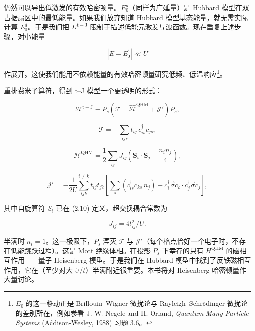 仍然可以导出低激发的有效哈密顿量。$E_{0}^{d}$（同样为广延量）是 Hubbard 模型在双占据扇区中的最低能量。如果我们放弃知道 Hubbard 模型基态能量，就无需实际计算 $E_{0}^{d}$。于是我们把 $H^{\mathrm{t-J}}$ 限制于描述低能元激发与波函数。现在重复上述步骤，对小能量

\begin{equation*}
\left| E - E _ {0} ^ {\prime} \right| \ll U
\tag{3.27}
\end{equation*}

作展开。这使我们能用不依赖能量的有效哈密顿量研究低频、低温响应\footnote{$E_{0}$ 的这一移动正是 Brillouin--Wigner 微扰论与 Rayleigh--Schrödinger 微扰论的差别所在，例如参看 J. W. Negele and H. Orland, \textit{Quantum Many Particle Systems} (Addison-Wesley, 1988) 习题 3.6。}。

重排费米子算符，得到 t--J 模型一个更透明的形式：

\begin{equation*}
\mathcal {H} ^ {\mathrm{t-J}} = P _ {s} \left( \mathcal {T} + \hat {\mathcal {H}} ^ {\mathrm{QHM}} + \mathcal {J} ' \right) P _ {s},
\tag{3.28}
\end{equation*}

\begin{equation*}
\mathcal {T} = - \sum_ {ijs} t _ {ij} \, c _ {is} ^ {\dagger} c _ {js},
\tag{3.29}
\end{equation*}

\begin{equation*}
\mathcal {H} ^ {\mathrm{QHM}} = \frac {1}{2} \sum_ {ij} J _ {ij} \left( \mathbf {S} _ {i} \cdot \mathbf {S} _ {j} - \frac {n _ {i} n _ {j}}{4} \right),
\tag{3.30}
\end{equation*}

\begin{equation*}
\mathcal {J} ' = - \frac {1}{2 U} \sum_ {ijk} ^ {i \neq k} t _ {ij} t _ {jk} \left[ \sum_ {s} \left( c _ {is} ^ {\dagger} c _ {ks} \, n _ {j} \right) - c _ {i} ^ {\dagger} \vec {\sigma} c _ {k} \cdot c _ {j} ^ {\dagger} \vec {\sigma} c _ {j} \right],
\tag{3.31}
\end{equation*}

其中自旋算符 $S_{i}$ 已在 (2.10) 定义，超交换耦合常数为

\begin{equation*}
J _ {ij} = 4 t _ {ij} ^ {2} / U.
\tag{3.32}
\end{equation*}

半满时 $n_{i}=1$。这一极限下，$P_{s}$ 湮灭 $\mathcal{T}$ 与 $\mathcal{J}'$（每个格点恰好一个电子时，不存在低能跳跃过程）。这是 Mott 绝缘体相。在投影 $P_{s}$ 下幸存的只有 $H^{\mathrm{QHM}}$ 的磁相互作用——量子 Heisenberg 模型。于是我们在 Hubbard 模型中找到了反铁磁相互作用，它在（至少对大 $U/t$）半满附近很重要。本书将对 Heisenberg 哈密顿量作大量讨论。

